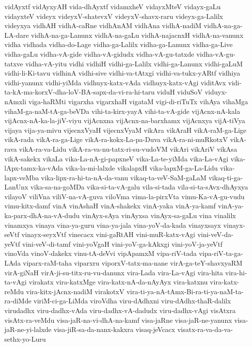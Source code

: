 {vidAyxtf
vidAyxyAH
vida-dhAyxtf
vidamxheV
vidayxMteV
vidayx-gaLu
vidayxteV
videyx
videyxV-shatevxV
videyxV-shavx-raru
videyx-ga-Lalilx
videyxya
vidhAH
vidhA-caRne
vidhAnAM
vidhAna
vidhA-nadiM
vidhA-na-ga-LA-dare
vidhA-na-ga-Lanunx
vidhA-na-gaLu
vidhA-najacnxH
vidhA-na-vanunx
vidha
vidhada
vidha-do-Lage
vidha-ga-Lalilx
vidha-ga-Lanunx
vidha-ga-Live
vidha-gaLu
vidha-vA-gide
vidha-vA-gidudx
vidha-vA-gu-tatxde
vidha-vA-gu-tatxve
vidha-vA-yitu
vidhi
vidhiH
vidhi-ga-Lalilx
vidhi-ga-Lanunx
vidhi-gaLuM
vidhi-li-Ki-tavu
vidhinA
vidhi-sive
vidhi-va-tAtxgi
vidhi-va-tukx-yARtf
vidhiya
vidhi-yanunx
vidhi-yiMda
vidhuyx-katx-vAda
vidhuyx-katx-vAgi
viditAvx
vidi-ta-kA-ma-korxV-dha-loV-BA-sapx-da-vi-ra-hi-taru
viduH
viduSoV
viduyx-nAmxli
viga-haRMti
vigarxha
vigarxhaH
vigataM
vigi-di-riTuTx
vihAya
vihaMga
vihaM-ga-naM-tA-ga-beVDa
vihi-ta-kirx-yayA
vihi-ta-vA-gide
vijAcnx-nA-kala
vijAcnx-nA-ka-la-jiV-viyu
vijAcnxna
vijAcnx-na-barxhamx
vijAcnxya
vijA-tiVya
vijaya
vija-ya-mivu
vijecnxVyaH
vijecnxVyaM
vikAra
vikAraH
vikA-raM-ga-Lige
vikA-rada
vikA-ra-ga-Lige
vikA-ra-kokx-La-pa-Duva
vikA-ra-ni-muRkotxV
vikA-rava
vikA-ra-va-Lidu
vikA-ra-va-nu-tatx-ri-su-vudoVM
vikAri
vikAriV
vikAsa
vikA-sakekx
vikaLa
vika-La-nA-gi-papxneV
vika-La-te-yiMda
vika-La-vAgi
vika-lApx-tamx-ka-vAda
vika-la-mi-lalxde
vikalapxH
vika-lapxM-ga-La-Lidu
vika-lapx-veMba
vika-lipx-ra-hi-ta-nA-da-vanu
vikaq-ta-veV-SaM-gaLaM
vikaq-ti-ga-LanUnx
vika-sa-na-goMDa
vika-si-ta-vA-galu
vila-si-tada
vila-si-ta-sAvx-dhAyxya
vilayoV
viliVna
viliV-na-vA-guva
viloVma
vima-la-pirxVta
vimu-Ka-vA-gu-vudu
vimu-kitx-damf
vinA
vinAshaH
vinA-shakekx
vinA-yaka
vinA-ya-kamf
vinA-ya-ka-parx-dhA-na-vA-dudu
vinAyx-sAya
vinAyxsa
vinAyx-sa-gaLu
vina
vinalilx
vinamxya
vinaya
vina-ya-guru
vina-ya-jala
vina-yoV-da-kada
vinayxsayx
vinayx-seVtf
vinayx-seyxVtf
vinecacx
vini-gaRtAH
vini-muR-katx-vAgi
vini-veV-da-yeVtf
vini-veV-di-tamf
vini-yoVgaH
vini-yoV-ga-kAkxgi
vini-yoV-ja-yeVtf
vinoVda
vinoV-dakekx
vinu-tA-deVvi
vipApamxM
vipa-riV-tada
vipa-riV-ta-ga-LAda
viparx-raM-taha
viparxru
viporxV-tatx-ma-nane
virA-ga-teY-shavxyaRM
virA-giNaH
virA-ji-su-titx-ru-vu-danunx
vira-Lada
vira-La-vAgi
vira-hita
vira-hi-ta-vAgi
virakatx
vira-katxMge
vira-katx-nA-da-nAyAyx
vira-katxnu
vira-katx-reMdu
vira-kitx-jAcnx-nadiM
virakotxV
vira-ti-ya-nA-tAmx-Bi-ra-ti-ya-naM-ta-ra-diMde
viriM-ci-ga-LiMda
viroVdha
viru-dAdhxni
viru-dAdhx-thaR-dalilx
virudadhx
viru-dadhx-vAda
viru-dadhx-vA-dadudx
viru-dadhx-vAgi
visAtxra
visAtx-ra-veMdu
visa-jaR-na-vi-dhA-na-kamf
visa-jaRne
visa-jaR-ne-yanunx
visa-jaR-ne-yi-lalxde
visa-jiR-sa-da-nanx-kakxra
visaq-jeVcacx
visatx-ra-va-da-va-sethx-yo-Luru
}
